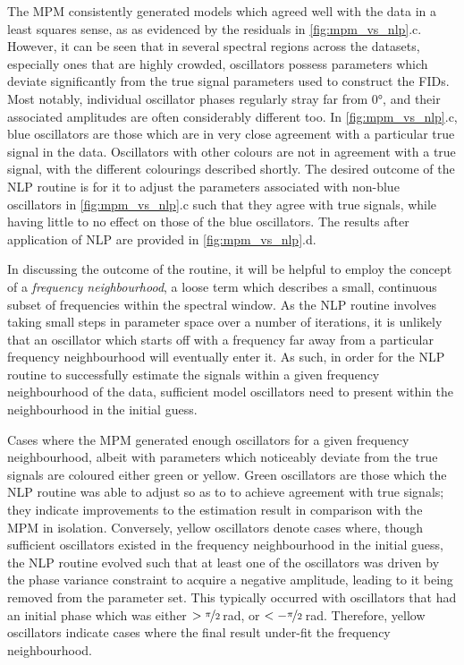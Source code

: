 The \ac{MPM} consistently generated models which agreed well with the data
in a least squares sense, as as evidenced by the residuals in
\cref{fig:mpm_vs_nlp}.c.
However, it can be seen that in several spectral regions across the datasets,
especially ones that are highly crowded, oscillators possess parameters which
deviate significantly from the true signal parameters used to construct the
\acp{FID}.
Most notably, individual oscillator phases regularly stray far from \ang{0},
and their associated amplitudes are often considerably different too.
In \cref{fig:mpm_vs_nlp}.c, blue oscillators are those which
are in very close agreement with a particular true signal in the data.
Oscillators with other colours are not in agreement with a true signal,
with the different colourings described shortly.
The desired outcome of the \ac{NLP} routine is for it to adjust the
parameters associated with non-blue oscillators in \cref{fig:mpm_vs_nlp}.c such
that they agree with true signals, while having little to no effect on those of
the blue oscillators. The results after application of \ac{NLP} are provided in
\cref{fig:mpm_vs_nlp}.d.

In discussing the outcome of the routine, it will be helpful to employ the
concept of a \emph{frequency neighbourhood}, a loose term which describes a
small, continuous subset of frequencies within the spectral window. As the
\ac{NLP} routine involves taking small steps
in parameter space over a number of iterations, it is unlikely that an
oscillator which starts off with a frequency far away from a particular
frequency neighbourhood will eventually enter it. As such, in order for the
\ac{NLP} routine to successfully estimate the signals within a given frequency
neighbourhood of the data, sufficient model oscillators need to present within
the neighbourhood in the initial guess.

Cases where the
\ac{MPM} generated enough oscillators for a given frequency neighbourhood,
albeit with parameters which noticeably deviate from the true signals are
coloured either green or yellow. Green oscillators are those which the \ac{NLP} routine
was able to adjust so as to to achieve agreement with true signals;
they indicate improvements to the estimation result in comparison with the \ac{MPM}
in isolation. Conversely, yellow oscillators denote cases where, though
sufficient oscillators existed in the frequency neighbourhood in the initial
guess, the \ac{NLP} routine evolved such that at least one of the oscillators
was driven by the phase variance constraint to acquire a negative amplitude,
leading to it being removed from the parameter set. This typically occurred with
oscillators that had an initial phase which was either $>
\nicefrac{\pi}{2}$\,\unit{\radian}, or $< -\nicefrac{\pi}{2}$\,\unit{\radian}.
Therefore, yellow oscillators indicate cases where the final result
under-fit the frequency neighbourhood.

